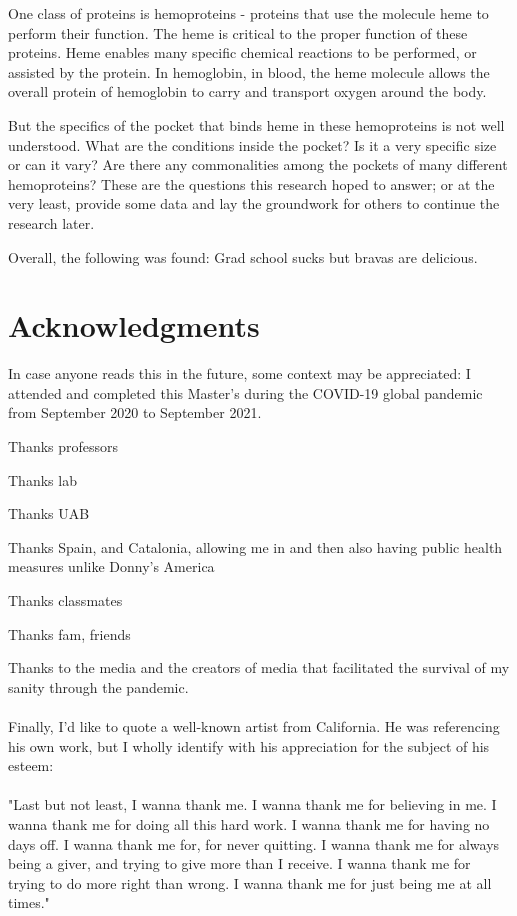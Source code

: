 \documentclass[12pt,oneside,a4paper]{report}
\begin{document}
		One class of proteins is hemoproteins - proteins that use the molecule heme to perform their function. The heme is critical to the proper function of these proteins. Heme enables many specific chemical reactions to be performed, or assisted by the protein. In hemoglobin, in blood, the heme molecule allows the overall protein of hemoglobin to carry and transport oxygen around the body.
		
		But the specifics of the pocket that binds heme in these hemoproteins is not well understood. What are the conditions inside the pocket? Is it a very specific size or can it vary? Are there any commonalities among the pockets of many different hemoproteins? These are the questions this research hoped to answer; or at the very least, provide some data and lay the groundwork for others to continue the research later.
		
		Overall, the following was found:
		Grad school sucks but bravas are delicious.
	
	\chapter*{Acknowledgments}
	
		In case anyone reads this in the future, some context may be appreciated: I attended and completed this Master's during the COVID-19 global pandemic from September 2020 to September 2021.
		
		Thanks professors
		
		Thanks lab
		
		Thanks UAB
		
		Thanks Spain, and Catalonia, allowing me in and then also having public health measures unlike Donny's America
		
		Thanks classmates
		
		Thanks fam, friends
		
		Thanks to the media and the creators of media that facilitated the survival of my sanity through the pandemic.
		\\~\\
		Finally, I'd like to quote a well-known artist from California. He was referencing his own work, but I wholly identify with his appreciation for the subject of his esteem:
		\\~\\
		"Last but not least, I wanna thank me. I wanna thank me for believing in me. I wanna thank me for doing all this hard work. I wanna thank me for having no days off. I wanna thank me for, for never quitting. I wanna thank me for always being a giver, and trying to give more than I receive. I wanna thank me for trying to do more right than wrong. I wanna thank me for just being me at all times."
		
\end{document}

